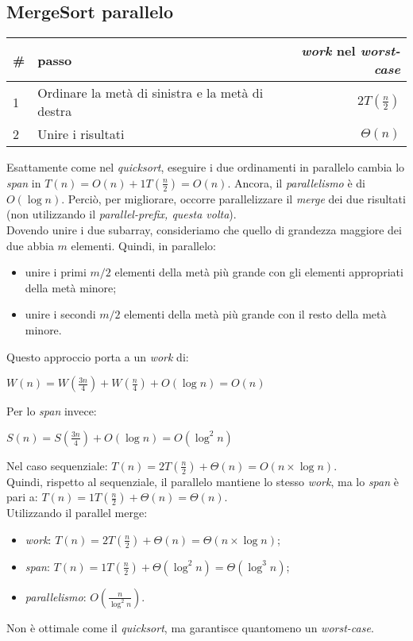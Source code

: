 \subsection{MergeSort parallelo}
\begin{center}
	\begin{tabular}{| l | l | r |}
		\hline
		\textbf{\#} & \textbf{passo} & \textbf{\textit{work} nel \textit{worst-case}} \\ \hline
		1 & Ordinare la metà di sinistra e la metà di destra & $2T(\frac{n}{2})$ \\
		2 & Unire i risultati & $\Theta(n)$ \\
		\hline
	\end{tabular}
\end{center}
Esattamente come nel \textit{quicksort}, eseguire i due ordinamenti in parallelo cambia lo \textit{span} in $T(n) = O(n) + 1T(\frac{n}{2}) = O(n)$. Ancora, il \textit{parallelismo} è di $O(\log{n})$. Perciò, per migliorare, occorre parallelizzare il \textit{merge} dei due risultati (non utilizzando il \textit{parallel-prefix, questa volta}). \\
Dovendo unire i due subarray, consideriamo che quello di grandezza maggiore dei due abbia $m$ elementi. Quindi, in parallelo:
\begin{itemize}
	\item unire i primi $m/2$ elementi della metà più grande con gli elementi appropriati della metà minore;
	\item unire i secondi $m/2$ elementi della metà più grande con il resto della metà minore.
\end{itemize}
Questo approccio porta a un \textit{work} di:
\begin{center}
	$W(n) = W(\frac{3n}{4}) + W(\frac{n}{4}) + O(\log{n}) = O(n)$
\end{center}
Per lo \textit{span} invece:
\begin{center}
	$S(n) = S(\frac{3n}{4}) + O(\log{n}) = O(\log^{2}n)$
\end{center}
Nel caso sequenziale: $T(n) = 2T(\frac{n}{2}) + \Theta(n) = O(n\times \log{n})$. \\
Quindi, rispetto al sequenziale, il parallelo mantiene lo stesso \textit{work}, ma lo \textit{span} è pari a: $T(n) = 1T(\frac{n}{2}) + \Theta(n) = \Theta(n)$. \\
Utilizzando il parallel merge:
\begin{itemize}
	\item \textit{work}: $T(n) = 2T(\frac{n}{2}) + \Theta(n) = \Theta(n\times \log{n})$;
	\item \textit{span}: $T(n) = 1T(\frac{n}{2}) + \Theta(\log^{2}{n}) = \Theta(\log^{3}{n})$;
	\item \textit{parallelismo}: $O(\frac{n}{\log^{2}{n}})$.
\end{itemize}
Non è ottimale come il \textit{quicksort}, ma garantisce quantomeno un \textit{worst-case}.